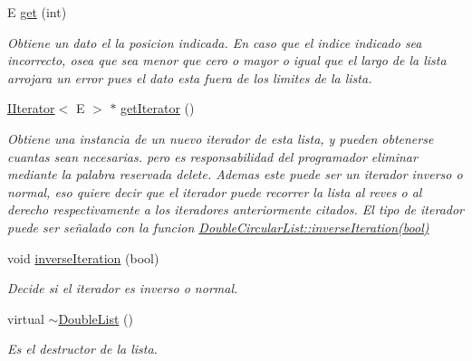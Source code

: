 \begin{DoxyCompactItemize}
E \hyperlink{classDoubleList_a230a8c9c574abe9c72f8daae35127d9c}{get} (int)
\begin{DoxyCompactList}\small\item\em Obtiene un dato el la posicion indicada. En caso que el indice indicado sea incorrecto, osea que sea menor que cero o mayor o igual que el largo de la lista arrojara un error pues el dato esta fuera de los limites de la lista. \end{DoxyCompactList}\item 
\hyperlink{classIIterator}{I\-Iterator}$<$ E $>$ $\ast$ \hyperlink{classDoubleList_aa14e383a97e054016a6c5178165b20df}{get\-Iterator} ()
\begin{DoxyCompactList}\small\item\em Obtiene una instancia de un nuevo iterador de esta lista, y pueden obtenerse cuantas sean necesarias. pero es responsabilidad del programador eliminar mediante la palabra reservada delete. Ademas este puede ser un iterador inverso o normal, eso quiere decir que el iterador puede recorrer la lista al reves o al derecho respectivamente a los iteradores anteriormente citados. El tipo de iterador puede ser señalado con la funcion \hyperlink{classDoubleCircularList_a77212c5d6ad148c99a06009a8c44128b}{Double\-Circular\-List\-::inverse\-Iteration(bool)}\end{DoxyCompactList}\item 
void \hyperlink{classDoubleList_a94d1ad5299452ea46839ba350ca501d1}{inverse\-Iteration} (bool)
\begin{DoxyCompactList}\small\item\em Decide si el iterador es inverso o normal. \end{DoxyCompactList}\item 
\hypertarget{classDoubleList_a11ce233388fea7a5722a7d57cea400a3}{virtual \hyperlink{classDoubleList_a11ce233388fea7a5722a7d57cea400a3}{$\sim$\-Double\-List} ()}\label{classDoubleList_a11ce233388fea7a5722a7d57cea400a3}

\begin{DoxyCompactList}\small\item\em Es el destructor de la lista. \end{DoxyCompactList}\end{DoxyCompactItemize}
